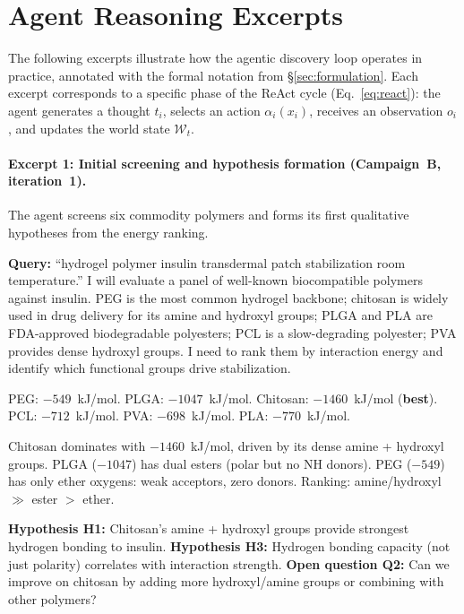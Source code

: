 \documentclass[twocolumn]{fairmeta}
\begin{document}
\section{Agent Reasoning Excerpts}
\label{app:reasoning}

The following excerpts illustrate how the agentic discovery loop operates in practice, annotated with the formal notation from \S\ref{sec:formulation}.
Each excerpt corresponds to a specific phase of the ReAct cycle (Eq.~\ref{eq:react}): the agent generates a thought $t_i$, selects an action $\alpha_i(x_i)$, receives an observation $o_i$, and updates the world state $\mathcal{W}_t$.

\paragraph{Excerpt 1: Initial screening and hypothesis formation (Campaign~B, iteration~1).}
The agent screens six commodity polymers and forms its first qualitative hypotheses from the energy ranking.

\begin{agentthought}
\scriptsize
\textbf{Query:} ``hydrogel polymer insulin transdermal patch stabilization room temperature.''
I will evaluate a panel of well-known biocompatible polymers against insulin.
PEG is the most common hydrogel backbone; chitosan is widely used in drug delivery for its amine and hydroxyl groups; PLGA and PLA are FDA-approved biodegradable polyesters; PCL is a slow-degrading polyester; PVA provides dense hydroxyl groups.
I need to rank them by interaction energy and identify which functional groups drive stabilization.
\end{agentthought}

\begin{toolcall}
\scriptsize
PEG: $-549$~kJ/mol. PLGA: $-1047$~kJ/mol. Chitosan: $-1460$~kJ/mol (\textbf{best}).
PCL: $-712$~kJ/mol. PVA: $-698$~kJ/mol. PLA: $-770$~kJ/mol.
\end{toolcall}

\begin{agentthought}
\scriptsize
Chitosan dominates with $-1460$~kJ/mol, driven by its dense amine + hydroxyl groups.
PLGA ($-1047$) has dual esters (polar but no NH donors). PEG ($-549$) has only ether oxygens: weak acceptors, zero donors.
Ranking: amine/hydroxyl $\gg$ ester $>$ ether.

\textbf{Hypothesis H1:} Chitosan's amine + hydroxyl groups provide strongest hydrogen bonding to insulin.
\textbf{Hypothesis H3:} Hydrogen bonding capacity (not just polarity) correlates with interaction strength.
\textbf{Open question Q2:} Can we improve on chitosan by adding more hydroxyl/amine groups or combining with other polymers?
\end{agentthought}
\end{document}
